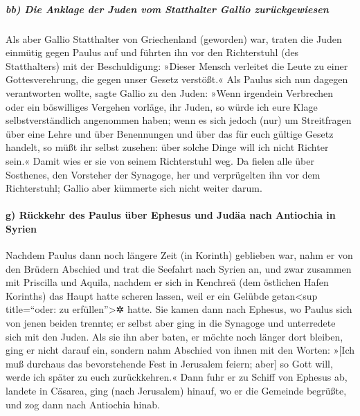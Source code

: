 \hypertarget{bb-die-anklage-der-juden-vom-statthalter-gallio-zuruxfcckgewiesen}{%
\subparagraph{bb) Die Anklage der Juden vom Statthalter Gallio
zurückgewiesen}\label{bb-die-anklage-der-juden-vom-statthalter-gallio-zuruxfcckgewiesen}}

 Als aber Gallio Statthalter von Griechenland (geworden)
war, traten die Juden einmütig gegen Paulus auf und führten ihn vor den
Richterstuhl (des Statthalters)  mit der Beschuldigung:
»Dieser Mensch verleitet die Leute zu einer Gottesverehrung, die gegen
unser Gesetz verstößt.«  Als Paulus sich nun dagegen
verantworten wollte, sagte Gallio zu den Juden: »Wenn irgendein
Verbrechen oder ein böswilliges Vergehen vorläge, ihr Juden, so würde
ich eure Klage selbstverständlich angenommen haben;  wenn
es sich jedoch (nur) um Streitfragen über eine Lehre und über
Benennungen und über das für euch gültige Gesetz handelt, so müßt ihr
selbst zusehen: über solche Dinge will ich nicht Richter sein.«
 Damit wies er sie von seinem Richterstuhl weg.
 Da fielen alle über Sosthenes, den Vorsteher der
Synagoge, her und verprügelten ihn vor dem Richterstuhl; Gallio aber
kümmerte sich nicht weiter darum.

\hypertarget{g-ruxfcckkehr-des-paulus-uxfcber-ephesus-und-juduxe4a-nach-antiochia-in-syrien}{%
\paragraph{g) Rückkehr des Paulus über Ephesus und Judäa nach Antiochia
in
Syrien}\label{g-ruxfcckkehr-des-paulus-uxfcber-ephesus-und-juduxe4a-nach-antiochia-in-syrien}}

 Nachdem Paulus dann noch längere Zeit (in Korinth)
geblieben war, nahm er von den Brüdern Abschied und trat die Seefahrt
nach Syrien an, und zwar zusammen mit Priscilla und Aquila, nachdem er
sich in Kenchreä (dem östlichen Hafen Korinths) das Haupt hatte scheren
lassen, weil er ein Gelübde getan\textless sup title=``oder: zu
erfüllen''\textgreater✲ hatte.  Sie kamen dann nach
Ephesus, wo Paulus sich von jenen beiden trennte; er selbst aber ging in
die Synagoge und unterredete sich mit den Juden.  Als sie
ihn aber baten, er möchte noch länger dort bleiben, ging er nicht darauf
ein,  sondern nahm Abschied von ihnen mit den Worten:
»{[}Ich muß durchaus das bevorstehende Fest in Jerusalem feiern; aber{]}
so Gott will, werde ich später zu euch zurückkehren.« Dann fuhr er zu
Schiff von Ephesus ab,  landete in Cäsarea, ging (nach
Jerusalem) hinauf, wo er die Gemeinde begrüßte, und zog dann nach
Antiochia hinab.

